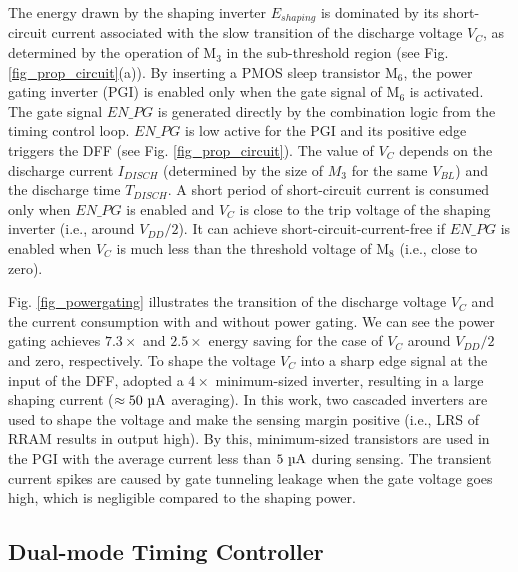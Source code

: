 The energy drawn by the shaping inverter $E_{shaping}$ is dominated by its short-circuit current associated with the slow transition of the discharge voltage $V_C$, as determined by the operation of M$_3$ in the sub-threshold region (see Fig. \ref{fig_prop_circuit}(a)).
By inserting a PMOS sleep transistor M$_6$, the power gating inverter (PGI) is enabled only when the gate signal of M$_6$ is activated.
The gate signal $EN\_PG$ is generated directly by the combination logic from  the timing control loop. $EN\_PG$ is low active for the PGI and its positive edge triggers the DFF (see Fig. \ref{fig_prop_circuit}).
The value of $V_C$ depends on the discharge current $I_{DISCH}$ (determined by the size of $M_3$ for the same $V_{BL}$) and the discharge time $T_{DISCH}$. A short period of short-circuit current is consumed only when $EN\_PG$ is enabled and $V_C$ is close to the trip voltage of the shaping inverter (i.e., around $V_{DD}/2$). It can achieve short-circuit-current-free if $EN\_PG$ is enabled when $V_C$ is much less than the threshold voltage of M$_8$ (i.e., close to zero). 

Fig. \ref{fig_powergating} illustrates the transition of the discharge voltage $V_C$ and the current consumption with and without power gating. 
We can see the power gating achieves $7.3\times$ and $2.5\times$ energy saving for the case of $V_C$ around $V_{DD}/2$ and zero, respectively. 
To shape the voltage $V_C$ into a sharp edge signal at the input of the DFF, \cite{trinh2018time} adopted a $4\times$ minimum-sized inverter, resulting in a large shaping current ($\approx 50~\rm \micro A$ averaging). In this work, two cascaded inverters are used to shape the voltage and make the sensing margin positive (i.e., LRS of RRAM results in output high). By this, minimum-sized transistors are used in the PGI with the average current less than $5~\rm \micro A$ during sensing. 
The transient current spikes are caused by gate tunneling leakage when the gate voltage goes high, which is negligible compared to the shaping power. 

\subsection{Dual-mode Timing Controller}


